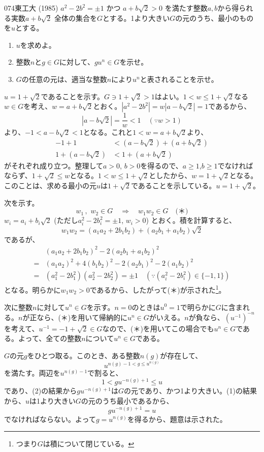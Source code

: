 \begin{prob}{074}{\maru}{東工大 (1985)}
 $a^2-2b^2=\pm 1$ かつ $a+b\sqrt{2}>0$ を満たす整数$a, b$から得られる実数$a+b\sqrt{2}$ 全体の集合を$G$とする。1より大きい$G$の元のうち、最小のものを$u$とする。
 \begin{enumerate}
  \item $u$を求めよ。
  \item 整数$n$と$g\in G$に対して、$gu^n\in G$を示せ。
  \item $G$の任意の元は、適当な整数$n$により$u^n$と表されることを示せ。
 \end{enumerate}
\end{prob}

$u=1+\sqrt{2}$であることを示す。$G\ni 1+\sqrt{2}>1$はよい。$1<w\le 1+\sqrt{2}$なる$w\in G$を考え、$w=a+b\sqrt{2}$とおく。$|a^2-2b^2|=w|a-b\sqrt{2}|=1$であるから、
\[ |a-b\sqrt{2}|=\frac{1}{w}<1 \quad (\because w>1) \]
より、$-1<a-b\sqrt{2}<1$となる。これと$1<w=a+b\sqrt{2}$より、
\begin{align*}
 -1+1&< (a-b\sqrt{2})+(a+b\sqrt{2}) \\
 1+(a-b\sqrt{2})&<1+(a+b\sqrt{2})
\end{align*}
がそれぞれ成り立つ。整理して$a>0$, $b>0$を得るので、$a\ge 1$,$b\ge 1$でなければならず、$1+\sqrt{2}\le w$となる。$1<w\le 1+\sqrt{2}$としたから、$w=1+\sqrt{2}$となる。このことは、求める最小の元$u$は$1+\sqrt{2}$であることを示している。$u=1+\sqrt{2}$。

次を示す。
\[ w_1 \,,\,\, w_2 \in G \quad\Rightarrow\quad w_1w_2\in G \quad\text{(＊)}\]
$w_i=a_i+b_i\sqrt{2}$ (ただし$a_i^2-2b_i^2=\pm 1$, $w_i>0$) とおく。積を計算すると、
\[ w_1w_2=(a_1a_2+2b_1b_2)+(a_2b_1+a_1b_2)\sqrt{2} \]
であるが、
\begin{align*}
 &(a_1a_2+2b_1b_2)^2-2(a_2b_1+a_1b_2)^2 \\
 =& (a_1a_2)^2+4(b_1b_2)^2-2(a_2b_1)^2-2(a_1b_2)^2 \\
 =& (a_1^2-2b_1^2)(a_2^2-2b_2^2)=\pm 1 \quad (\because (a_i^2-2b_i^2)\in\{-1, 1\})
\end{align*}
となる。明らかに$w_1w_2>0$であるから、したがって(＊)が示された\footnote{つまり$G$は積について閉じている。}。

次に整数$n$に対して$u^n\in G$を示す。$n=0$のときは$u^0=1$で明らかに$G$に含まれる。$n$が正なら、(＊)を用いて帰納的に$u^n \in G$がいえる。$n$が負なら、$(u^{-1})^{-n}$を考えて、$u^{-1}=-1+\sqrt{2} \in G$なので、(＊)を用いてこの場合でも$u^n \in G$である。よって、全ての整数$n$について$u^n \in G$である。

$G$の元$g$をひとつ取る。このとき、ある整数$n(g)$が存在して、
\[ u^{n(g)-1 < g \le u^{n(g)}} \]
を満たす。両辺を$u^{n(g)-1}$で割ると、
\[ 1 < g u^{-n(g)+1} \le u \]
であり、(2)の結果から$g u^{-n(g)+1}$は$G$の元であり、かつ1より大きい。(1)の結果から、$u$は1より大きい$G$の元のうち最小であるから、
\[ gu^{-n(g)+1}=u \]
でなければならない。よって$g=u^{n(g)}$を得るから、題意は示された。